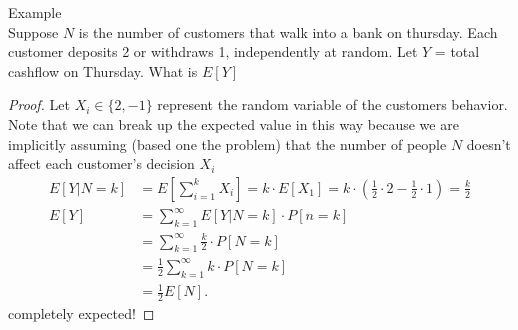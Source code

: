\documentclass[a4paper]{article}
\begin{document}
\begin{note}{Example} \\
  Suppose $N$ is the number of customers that walk into a bank on thursday. Each customer deposits 2 or withdraws
  1, independently at random. Let  $Y$ = total cashflow on Thursday. What is $E[Y]$
  
  \begin{proof}
    Let $X_i \in \{2,-1\} $ represent the random variable of the customers behavior. Note that we can break up
    the expected value in this way because we are implicitly assuming (based one the problem) that the number of 
    people $N$ doesn't affect each customer's decision  $X_i$
    \begin{align*}
      E[Y|N=k] &= E[\sum_{i=1}^{k} X_i] = k \cdot E[X_1] = k \cdot \left( \frac{1}{2} \cdot 2 - \frac{1}{2} \cdot 1 \right) = \frac{k}{2} \\
      E[Y] &= \sum_{k=1}^{\infty} E[Y|N=k] \cdot P[n=k] \\
           &= \sum_{k=1}^{\infty} \frac{k}{2} \cdot P[N=k] \\
           &= \frac{1}{2}\sum_{k=1}^{\infty} k \cdot P[N=k] \\
           &= \frac{1}{2} E[N]
    .\end{align*}
    completely expected! 
  \end{proof}


\end{note}
\end{document}
